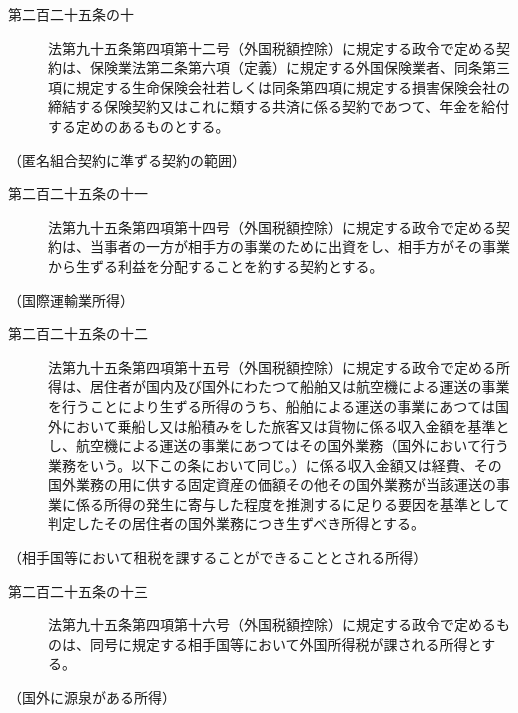 \documentclass[twocolumn,a4j,10pt]{ltjtarticle}
\begin{document}
\begin{description}
\item[第二百二十五条の十]法第九十五条第四項第十二号（外国税額控除）に規定する政令で定める契約は、保険業法第二条第六項（定義）に規定する外国保険業者、同条第三項に規定する生命保険会社若しくは同条第四項に規定する損害保険会社の締結する保険契約又はこれに類する共済に係る契約であつて、年金を給付する定めのあるものとする。
\end{description}
\noindent\hspace{10pt}（匿名組合契約に準ずる契約の範囲）
\begin{description}
\item[第二百二十五条の十一]法第九十五条第四項第十四号（外国税額控除）に規定する政令で定める契約は、当事者の一方が相手方の事業のために出資をし、相手方がその事業から生ずる利益を分配することを約する契約とする。
\end{description}
\noindent\hspace{10pt}（国際運輸業所得）
\begin{description}
\item[第二百二十五条の十二]法第九十五条第四項第十五号（外国税額控除）に規定する政令で定める所得は、居住者が国内及び国外にわたつて船舶又は航空機による運送の事業を行うことにより生ずる所得のうち、船舶による運送の事業にあつては国外において乗船し又は船積みをした旅客又は貨物に係る収入金額を基準とし、航空機による運送の事業にあつてはその国外業務（国外において行う業務をいう。以下この条において同じ。）に係る収入金額又は経費、その国外業務の用に供する固定資産の価額その他その国外業務が当該運送の事業に係る所得の発生に寄与した程度を推測するに足りる要因を基準として判定したその居住者の国外業務につき生ずべき所得とする。
\end{description}
\noindent\hspace{10pt}（相手国等において租税を課することができることとされる所得）
\begin{description}
\item[第二百二十五条の十三]法第九十五条第四項第十六号（外国税額控除）に規定する政令で定めるものは、同号に規定する相手国等において外国所得税が課される所得とする。
\end{description}
\noindent\hspace{10pt}（国外に源泉がある所得）
\end{document}
